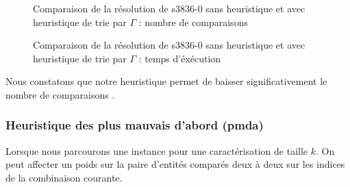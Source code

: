 \documentclass[a4paper,10pt]{article}
\begin{document}
\begin{figure}[H]
\begin{center}
\end{center}
\caption{Comparaison de la résolution de s3836-0 sans heuristique et avec heuristique de trie par $\Gamma$ : nombre de comparaisons}
\end{figure}


\begin{figure}[H]
\begin{center}
\end{center}
\caption{Comparaison de la résolution de s3836-0 sans heuristique et avec heuristique de trie par $\Gamma$ : temps d'éxécution}
\end{figure}

Nous constatons que notre heuristique permet de baisser significativement le nombre de comparaisons .

\subsubsection{Heuristique des plus mauvais d'abord (pmda)}
Lorsque nous parcourons une instance pour une caractérisation de taille $k$. On peut affecter un poids sur la paire d'entités comparés deux à deux sur les indices de la combinaison courante.
\end{document}

